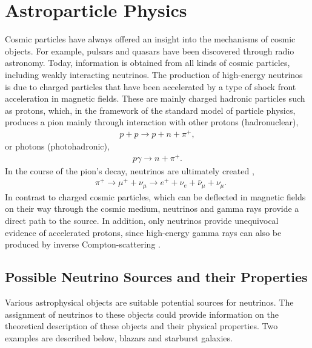 \chapter{Astroparticle Physics} \label{sec:astro}

Cosmic particles have always offered an insight into the mechanisms of cosmic objects.
For example, pulsars and quasars have been discovered through radio astronomy.
Today, information is obtained from all kinds of cosmic particles, including weakly interacting neutrinos.
The production of high-energy neutrinos is due to charged particles that have been accelerated by a type of shock front acceleration in magnetic fields.
These are mainly charged hadronic particles such as protons, which, in the framework of the standard model of particle physics, produces a pion mainly through interaction with other protons (hadronuclear),
\begin{align}
  p+p \rightarrow p+n+\pi^+,
\end{align}
or photons (photohadronic),
\begin{align}
  p\gamma \rightarrow n+\pi^+.
\end{align}
In the course of the pion's decay, neutrinos are ultimately created \cite{pdg},
\begin{align}
  &\pi^+ \rightarrow \mu^++\nu_\mu \rightarrow e^++\nu_e+\bar{\nu}_\mu+\nu_\mu.
\end{align}
In contrast to charged cosmic particles, which can be deflected in magnetic fields on their way through the cosmic medium, neutrinos and gamma rays provide a direct path to the source.
In addition, only neutrinos provide unequivocal evidence of accelerated protons, since high-energy gamma rays can also be produced by inverse Compton-scattering \cite{spiering}.


\section{Possible Neutrino Sources and their Properties}

Various astrophysical objects are suitable potential sources for neutrinos.
The assignment of neutrinos to these objects could provide information on the theoretical description of these objects and their physical properties.
Two examples are described below, blazars and starburst galaxies.


